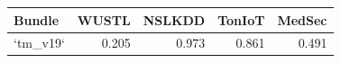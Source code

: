 \begin{tabular}{lrrrr}
\toprule
Bundle & WUSTL & NSLKDD & TonIoT & MedSec \\
\midrule
`tm\_v19` & 0.205 & 0.973 & 0.861 & 0.491 \\
\bottomrule
\end{tabular}

